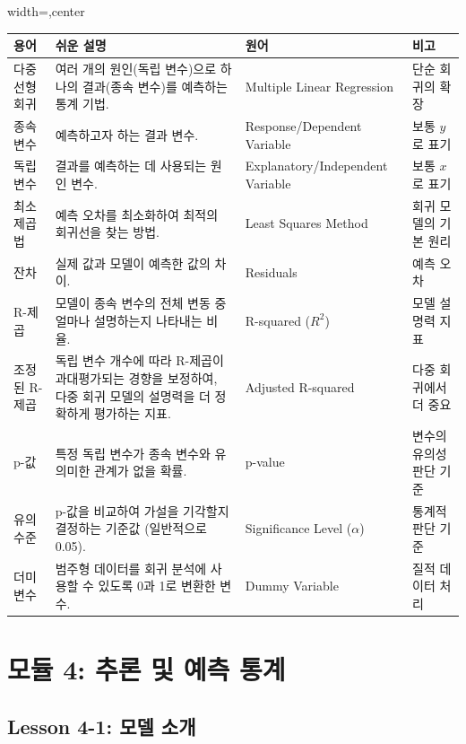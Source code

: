 \documentclass[11pt,a4paper]{article}
\theoremstyle{definition}
\begin{document}
\begin{definitionbox}
\begin{adjustbox}{width=\textwidth,center}
\begin{tabular}{p{} p{} p{} p{}}
\toprule
\textbf{용어} & \textbf{쉬운 설명} & \textbf{원어} & \textbf{비고} \\
\midrule
다중 선형 회귀 & 여러 개의 원인(독립 변수)으로 하나의 결과(종속 변수)를 예측하는 통계 기법. & Multiple Linear Regression & 단순 회귀의 확장 \\
종속 변수 & 예측하고자 하는 결과 변수. & Response/Dependent Variable & 보통 $y$로 표기 \\
독립 변수 & 결과를 예측하는 데 사용되는 원인 변수. & Explanatory/Independent Variable & 보통 $x$로 표기 \\
최소 제곱법 & 예측 오차를 최소화하여 최적의 회귀선을 찾는 방법. & Least Squares Method & 회귀 모델의 기본 원리 \\
잔차 & 실제 값과 모델이 예측한 값의 차이. & Residuals & 예측 오차 \\
R-제곱 & 모델이 종속 변수의 전체 변동 중 얼마나 설명하는지 나타내는 비율. & R-squared ($R^2$) & 모델 설명력 지표 \\
조정된 R-제곱 & 독립 변수 개수에 따라 R-제곱이 과대평가되는 경향을 보정하여, 다중 회귀 모델의 설명력을 더 정확하게 평가하는 지표. & Adjusted R-squared & 다중 회귀에서 더 중요 \\
p-값 & 특정 독립 변수가 종속 변수와 유의미한 관계가 없을 확률. & p-value & 변수의 유의성 판단 기준 \\
유의 수준 & p-값을 비교하여 가설을 기각할지 결정하는 기준값 (일반적으로 0.05). & Significance Level ($\alpha$) & 통계적 판단 기준 \\
더미 변수 & 범주형 데이터를 회귀 분석에 사용할 수 있도록 0과 1로 변환한 변수. & Dummy Variable & 질적 데이터 처리 \\
\bottomrule
\end{tabular}
\end{adjustbox}
\end{definitionbox}

\newpage
\section{모듈 4: 추론 및 예측 통계}

\subsection{Lesson 4-1: 모델 소개}
\end{document}
